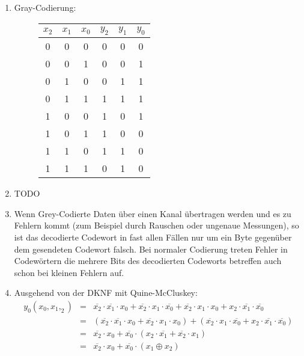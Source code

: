 \documentclass[DIN, pagenumber=false, fontsize=11pt, parskip=half]{scrartcl}
\begin{document}
    \subsection{}
    \begin{enumerate}[label=(\alph*)]
        \item 
            Gray-Codierung:
            \begin{figure}[H]
                \centering
                \begin{tabular}{ccc|ccc}
                    \toprule
                    $x_2$ & $x_1$ & $x_0$ & $y_2$ & $y_1$ & $y_0$ \\
                    \midrule
                    0 & 0 & 0 & 0 & 0 & 0\\
                    0 & 0 & 1 & 0 & 0 & 1\\
                    0 & 1 & 0 & 0 & 1 & 1\\
                    0 & 1 & 1 & 1 & 1 & 1\\
                    1 & 0 & 0 & 1 & 0 & 1\\
                    1 & 0 & 1 & 1 & 0 & 0\\
                    1 & 1 & 0 & 1 & 1 & 0\\
                    1 & 1 & 1 & 0 & 1 & 0\\
                    \bottomrule
                \end{tabular}
            \end{figure}
        \item TODO
        \item Wenn Grey-Codierte Daten über einen Kanal übertragen werden und
            es zu Fehlern kommt (zum Beispiel durch Rauschen oder ungenaue Messungen), so ist das decodierte Codewort in fast allen Fällen nur um ein
            Byte gegenüber dem gesendeten Codewort falsch. Bei \glqq{}normaler\grqq{} Codierung treten Fehler in Codewörtern die mehrere Bits des decodierten Codeworts betreffen auch schon bei kleinen Fehlern auf.
        \item 
            Ausgehend von der DKNF mit Quine-McCluskey:
            \begin{eqnarray*}
                y_0(x_0, x_1, _2) &=& 
                \overline{x_2} \cdot \overline{x_1} \cdot x_0 + 
                \overline{x_2} \cdot x_1 \cdot \overline{x_0} +
                \overline{x_2} \cdot x_1 \cdot x_0 +
                x_2 \cdot \overline{x_1} \cdot \overline{x_0} \\
                &=& (\overline{x_2} \cdot \overline{x_1} \cdot x_0 + 
                \overline{x_2} \cdot x_1 \cdot x_0) +
                (\overline{x_2} \cdot x_1 \cdot \overline{x_0} +
                x_2 \cdot \overline{x_1} \cdot \overline{x_0}) \\
                &=& \overline{x_2} \cdot x_0 +
                \overline{x_0} \cdot (x_2 \cdot \overline{x_1} + \overline{x_2} \cdot x_1) \\
                &=& \overline{x_2} \cdot x_0 + \overline{x_0} \cdot (x_1 \oplus x_2)
            \end{eqnarray*}
    \end{enumerate}
\end{document}
